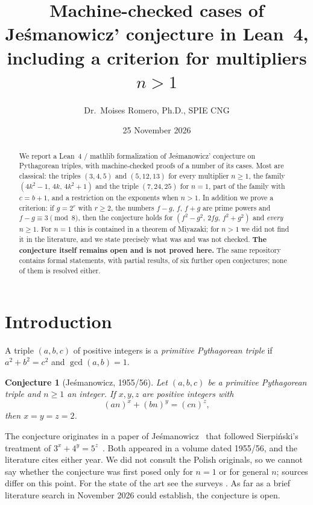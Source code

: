 \documentclass[11pt,a4paper]{article}
\title{Machine-checked cases of Je\'smanowicz' conjecture in Lean~4,\\
including a criterion for multipliers $n>1$}
\author{Dr.\ Moises Romero, Ph.D., SPIE CNG}
\date{25 November 2026}
\newtheorem{conjecture}{Conjecture}
\theoremstyle{remark}
\begin{document}
\maketitle

\begin{abstract}
We report a Lean~4 / mathlib formalization of Je\'smanowicz' conjecture on
Pythagorean triples, with machine-checked proofs of a number of its cases.
Most are classical: the triples $(3,4,5)$ and $(5,12,13)$ for every multiplier
$n\ge 1$, the family $(4k^2-1,\,4k,\,4k^2+1)$ and the triple $(7,24,25)$ for
$n=1$, part of the family with $c=b+1$, and a restriction on the exponents
when $n>1$. In addition we prove a criterion: if $g=2^r$ with $r\ge 2$, the
numbers $f-g$, $f$, $f+g$ are prime powers and $f-g\equiv 3 \pmod 8$, then the
conjecture holds for $(f^2-g^2,\,2fg,\,f^2+g^2)$ and \emph{every} $n\ge 1$.
For $n=1$ this is contained in a theorem of Miyazaki; for $n>1$ we did not find
it in the literature, and we state precisely what was and was not checked.
\textbf{The conjecture itself remains open and is not proved here.} The same
repository contains formal statements, with partial results, of six further
open conjectures; none of them is resolved either.
\end{abstract}

\section{Introduction}

A triple $(a,b,c)$ of positive integers is a \emph{primitive Pythagorean
triple} if $a^2+b^2=c^2$ and $\gcd(a,b)=1$.

\begin{conjecture}[Je\'smanowicz, 1955/56]\label{conj}
Let $(a,b,c)$ be a primitive Pythagorean triple and $n\ge 1$ an integer. If
$x,y,z$ are positive integers with
\begin{equation}\label{eq:main}
(an)^x+(bn)^y=(cn)^z ,
\end{equation}
then $x=y=z=2$.
\end{conjecture}

The conjecture originates in a paper of Je\'smanowicz~\cite{Jes} that followed
Sierpi\'nski's treatment of $3^x+4^y=5^z$~\cite{Sier}. Both appeared in a
volume dated 1955/56, and the literature cites either year. We did not consult
the Polish originals, so we cannot say whether the conjecture was first posed
only for $n=1$ or for general $n$; sources differ on this point. For the state
of the art see the surveys \cite{LSS,SDCT}. As far as a brief literature search
in November 2026 could establish, the conjecture is open.
\end{document}
